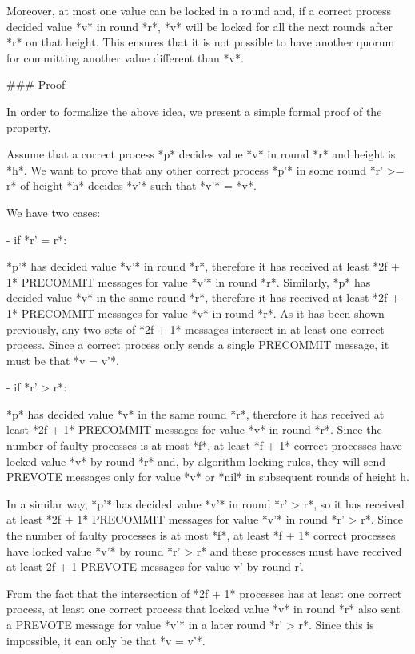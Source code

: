 \documentclass[a4paper,11pt,oneside]{report}
\begin{document}
\begin{markdown}
Moreover, at most one value can be locked in a round and, if a correct process decided value *v* in round *r*, *v* will be locked for all the next rounds after *r* on that height. This ensures that it is not possible to have another quorum for committing another value different than *v*.

### Proof

In order to formalize the above idea, we present a simple formal proof of the property.

Assume that a correct process *p* decides value *v* in round *r* and height is *h*. We want to prove that any other correct process *p'* in some round *r' >= r* of height *h* decides *v'* such that *v'* = *v*.

We have two cases:

- if *r' = r*: 

    *p'* has decided value *v'* in round *r*, therefore it has received at least *2f + 1* PRECOMMIT messages for value *v'* in round *r*. 
    Similarly, *p* has decided value *v* in the same round *r*, therefore it has received at least *2f + 1* PRECOMMIT messages for value *v* in round *r*. 
    As it has been shown previously, any two sets of *2f + 1* messages intersect in at least one correct process. Since a correct process only sends a single PRECOMMIT message, it must be that *v = v'*.  

- if *r' > r*:
        
    *p* has decided value *v* in the same round *r*, therefore it has received at least *2f + 1* PRECOMMIT messages for value *v* in round *r*.
    Since the number of faulty processes is at most *f*, at least *f + 1* correct processes have locked value *v* by round *r* and, by algorithm locking rules, they will send PREVOTE messages only for value *v* or *nil* in subsequent rounds of height h.
    
    In a similar way, *p'* has decided value *v'* in round *r' > r*, so it has received at least *2f + 1* PRECOMMIT messages for value *v'* in round *r' > r*. 
    Since the number of faulty processes is at most *f*, at least *f + 1* correct processes have locked value *v'* by round *r' > r* and these processes must have received at least 2f + 1 PREVOTE messages for value v' by round r'.
    
    From the fact that the intersection of *2f + 1* processes has at least one correct process, at least one correct process that locked value *v* in round *r* also sent a PREVOTE message for value *v'* in a later round *r' > r*. 
    Since this is impossible, it can only be that *v = v'*.


\end{markdown}
\end{document}
